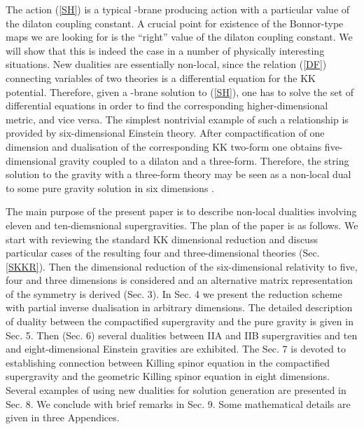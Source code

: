 \documentclass[a4paper,12pt]{article}
\begin{document}
The action (\ref{SH}) is a typical \coordHE{}-brane producing action
with a particular value of the dilaton coupling constant. A
crucial point for existence of the Bonnor-type maps we are
looking for is the ``right'' value of the dilaton coupling
constant. We will show that this is indeed the case in a number
of physically interesting situations. New dualities are
essentially non-local, since the relation (\ref{DF}) connecting
variables of two theories is a differential equation for the KK
potential. Therefore, given a \coordHE{}-brane solution to (\ref{SH}),
one has to solve the set of differential equations in order to
find the corresponding higher-dimensional metric, and vice
versa. The simplest nontrivial example of such a relationship is
provided by six-dimensional Einstein theory. After
compactification of one dimension and dualisation of the
corresponding KK two-form one obtains five-dimensional gravity
coupled to a dilaton and a three-form. Therefore, the string
solution to the \coordHE{} gravity with a three-form theory may be
seen as a non-local dual to some pure gravity solution in six
dimensions \cite{ChGaMaSh99}.

The main purpose of the present paper is to describe non-local
dualities involving eleven and ten-diemsnional supergravities.
The plan of the paper is as follows. We start with reviewing the
standard KK dimensional reduction and discuss particular cases
of the resulting four and three-dimensional theories (Sec.
\ref{SKKR}). Then the dimensional reduction of the
six-dimensional relativity to five, four and three dimensions
is considered and an alternative matrix representation of the
\coordHE{} symmetry is derived (Sec. 3). In Sec. 4 we present
the reduction scheme with partial inverse dualisation in
arbitrary dimensions. The detailed description of duality
between the compactified \coordHE{} supergravity and the \coordHE{} pure
gravity is given in Sec. 5. Then (Sec. 6) several dualities
between IIA and IIB supergravities and ten and
eight-dimensional Einstein gravities are exhibited. The Sec. 7
is devoted to establishing connection between Killing spinor
equation in the compactified \coordHE{} supergravity and the
geometric Killing spinor equation in eight dimensions. Several
examples of using new dualities for solution generation are
presented in Sec. 8. We conclude with brief remarks in Sec. 9.
Some mathematical details are given in three Appendices.
\end{document}
